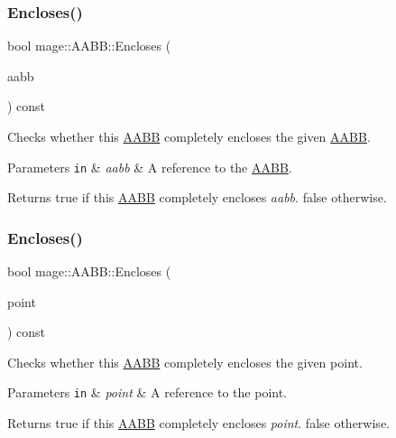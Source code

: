 \subsubsection{\texorpdfstring{Encloses()}{Encloses()}\hspace{0.1cm}{\footnotesize\ttfamily [1/3]}}
{\footnotesize\ttfamily bool mage\+::\+A\+A\+B\+B\+::\+Encloses (\begin{DoxyParamCaption}\item[{const \hyperlink{structmage_1_1_a_a_b_b}{A\+A\+BB} \&}]{aabb }\end{DoxyParamCaption}) const}

Checks whether this \hyperlink{structmage_1_1_a_a_b_b}{A\+A\+BB} completely encloses the given \hyperlink{structmage_1_1_a_a_b_b}{A\+A\+BB}.


\begin{DoxyParams}[1]{Parameters}
\mbox{\tt in}  & {\em aabb} & A reference to the \hyperlink{structmage_1_1_a_a_b_b}{A\+A\+BB}. \\
\hline
\end{DoxyParams}
\begin{DoxyReturn}{Returns}
{\ttfamily true} if this \hyperlink{structmage_1_1_a_a_b_b}{A\+A\+BB} completely encloses {\itshape aabb}. {\ttfamily false} otherwise. 
\end{DoxyReturn}
\hypertarget{structmage_1_1_a_a_b_b_a6b1d39d7d8473e38d101eb8427301a7d}{}\label{structmage_1_1_a_a_b_b_a6b1d39d7d8473e38d101eb8427301a7d} 
\subsubsection{\texorpdfstring{Encloses()}{Encloses()}\hspace{0.1cm}{\footnotesize\ttfamily [2/3]}}
{\footnotesize\ttfamily bool mage\+::\+A\+A\+B\+B\+::\+Encloses (\begin{DoxyParamCaption}\item[{const X\+M\+F\+L\+O\+A\+T3 \&}]{point }\end{DoxyParamCaption}) const}

Checks whether this \hyperlink{structmage_1_1_a_a_b_b}{A\+A\+BB} completely encloses the given point.


\begin{DoxyParams}[1]{Parameters}
\mbox{\tt in}  & {\em point} & A reference to the point. \\
\hline
\end{DoxyParams}
\begin{DoxyReturn}{Returns}
{\ttfamily true} if this \hyperlink{structmage_1_1_a_a_b_b}{A\+A\+BB} completely encloses {\itshape point}. {\ttfamily false} otherwise. 
\end{DoxyReturn}
\hypertarget{structmage_1_1_a_a_b_b_ab57318f2ea79779ed357a7ecdd101132}{}\label{structmage_1_1_a_a_b_b_ab57318f2ea79779ed357a7ecdd101132} 
